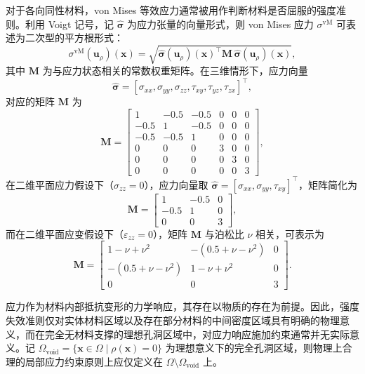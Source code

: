 对于各向同性材料，von Mises 等效应力通常被用作判断材料是否屈服的强度准则。利用 Voigt 记号，记 $\hat{\boldsymbol{\sigma}}$ 为应力张量的向量形式，则 von Mises 应力 $\sigma^{\text{vM}}$ 可表述为二次型的平方根形式：
\[
\sigma^{\text{vM}}(\boldsymbol{u}_\rho)(\boldsymbol{x}) = \sqrt{ \hat{\boldsymbol{\sigma}}(\boldsymbol{u}_\rho)(\boldsymbol{x})^\top \boldsymbol{M} \, \hat{\boldsymbol{\sigma}}(\boldsymbol{u}_\rho)(\boldsymbol{x})},
\]
其中 $\boldsymbol{M}$ 为与应力状态相关的常数权重矩阵。在三维情形下，应力向量
\[
\hat{\boldsymbol{\sigma}} = [\sigma_{xx}, \sigma_{yy}, \sigma_{zz}, \tau_{xy}, \tau_{yz}, \tau_{zx}]^\top,
\]
对应的矩阵 $\boldsymbol{M}$ 为
\[
\boldsymbol{M} = 
\begin{bmatrix} 
	1 & -0.5 & -0.5 & 0 & 0 & 0 \\ 
	-0.5 & 1 & -0.5 & 0 & 0 & 0 \\ 
	-0.5 & -0.5 & 1 & 0 & 0 & 0 \\ 
	0 & 0 & 0 & 3 & 0 & 0 \\ 
	0 & 0 & 0 & 0 & 3 & 0 \\ 
	0 & 0 & 0 & 0 & 0 & 3 
\end{bmatrix},
\]
在二维平面应力假设下（$\sigma_{zz} = 0$），应力向量取 $\hat{\boldsymbol{\sigma}} = [\sigma_{xx}, \sigma_{yy}, \tau_{xy}]^\top$，矩阵简化为
\[
\boldsymbol{M} = 
\begin{bmatrix} 
	1 & -0.5 & 0 \\ -0.5 & 1 & 0 \\ 0 & 0 & 3 
\end{bmatrix},
\]
而在二维平面应变假设下（$\varepsilon_{zz} = 0$），矩阵 $\boldsymbol{M}$ 与泊松比 $\nu$ 相关，可表示为
\[
\boldsymbol{M} = 
\begin{bmatrix} 
	1-\nu+\nu^2 & -(0.5+\nu-\nu^2) & 0 \\ -(0.5+\nu-\nu^2) & 1-\nu+\nu^2 & 0 \\ 0 & 0 & 3 
\end{bmatrix}.
\]

应力作为材料内部抵抗变形的力学响应，其存在以物质的存在为前提。因此，强度失效准则仅对实体材料区域以及存在部分材料的中间密度区域具有明确的物理意义，而在完全无材料支撑的理想孔洞区域中，对应力响应施加约束通常并无实际意义。记 $\Omega_{\text{void}} = \{ \boldsymbol{x} \in \Omega \mid \rho(\boldsymbol{x}) = 0 \}$ 为理想意义下的完全孔洞区域，则物理上合理的局部应力约束原则上应仅定义在 $\Omega \setminus \Omega_{\text{void}}$ 上。


